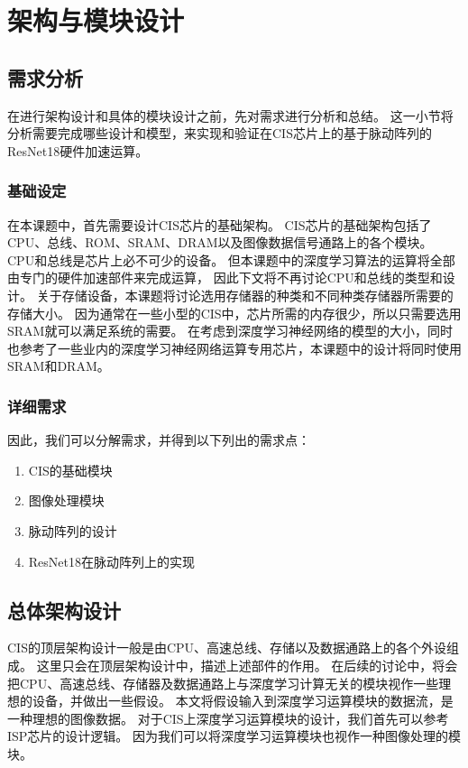 
\chapter{架构与模块设计}

\section{需求分析}
在进行架构设计和具体的模块设计之前，先对需求进行分析和总结。
这一小节将分析需要完成哪些设计和模型，来实现和验证在CIS芯片上的基于脉动阵列的ResNet18硬件加速运算。


\subsection{基础设定}

在本课题中，首先需要设计CIS芯片的基础架构。
CIS芯片的基础架构包括了CPU、总线、ROM、SRAM、DRAM以及图像数据信号通路上的各个模块。
CPU和总线是芯片上必不可少的设备。
但本课题中的深度学习算法的运算将全部由专门的硬件加速部件来完成运算，
因此下文将不再讨论CPU和总线的类型和设计。
关于存储设备，本课题将讨论选用存储器的种类和不同种类存储器所需要的存储大小。
因为通常在一些小型的CIS中，芯片所需的内存很少，所以只需要选用SRAM就可以满足系统的需要。
在考虑到深度学习神经网络的模型的大小，同时也参考了一些业内的深度学习神经网络运算专用芯片，本课题中的设计将同时使用SRAM和DRAM。


\subsection{详细需求}


因此，我们可以分解需求，并得到以下列出的需求点：
\begin{enumerate}
    \item CIS的基础模块
    \item 图像处理模块
    \item 脉动阵列的设计
    \item ResNet18在脉动阵列上的实现
\end{enumerate}

\section{总体架构设计}
CIS的顶层架构设计一般是由CPU、高速总线、存储以及数据通路上的各个外设组成。
这里只会在顶层架构设计中，描述上述部件的作用。
在后续的讨论中，将会把CPU、高速总线、存储器及数据通路上与深度学习计算无关的模块视作一些理想的设备，并做出一些假设。
本文将假设输入到深度学习运算模块的数据流，是一种理想的图像数据。
对于CIS上深度学习运算模块的设计，我们首先可以参考ISP芯片的设计逻辑。
因为我们可以将深度学习运算模块也视作一种图像处理的模块。



